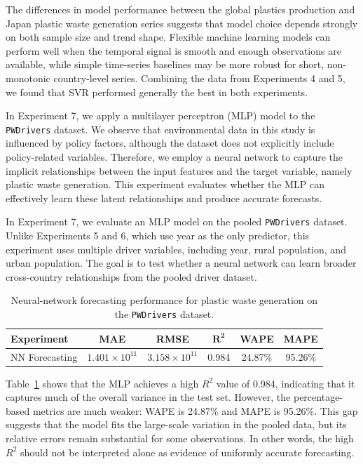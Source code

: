 The differences in model performance between the global plastics production and Japan plastic waste generation series suggests that model choice depends strongly on both sample size and trend shape. Flexible machine learning models can perform well when the temporal signal is smooth and enough observations are available, while simple time-series baselines may be more robust for short, non-monotonic country-level series. Combining the data from Experiments 4 and 5, we found that SVR performed generally the best in both experiments.


In Experiment 7, we apply a multilayer perceptron (MLP) model to the \texttt{PWDrivers} dataset. We observe that environmental data in this study is influenced by policy factors, although the dataset does not explicitly include policy-related variables. Therefore, we employ a neural network to capture the implicit relationships between the input features and the target variable, namely plastic waste generation. This experiment evaluates whether the MLP can effectively learn these latent relationships and produce accurate forecasts.

In Experiment 7, we evaluate an MLP model on the pooled \texttt{PWDrivers} dataset. Unlike Experiments 5 and 6, which use year as the only predictor, this experiment uses multiple driver variables, including year, rural population, and urban population. The goal is to test whether a neural network can learn broader cross-country relationships from the pooled driver dataset.

\begin{table}[!ht]
	\centering
	\caption{\centering Neural-network forecasting performance for plastic waste generation on the \texttt{PWDrivers} dataset.}
	\begin{tabular}{@{}lccccc@{}}
		\toprule
		\textbf{Experiment} & \textbf{MAE}           & \textbf{RMSE}          & $\mathbf{R^2}$ & \textbf{WAPE} & \textbf{MAPE} \\
		\midrule
		NN Forecasting      & \(1.401 \times 10^11\) & \(3.158 \times 10^11\) & 0.984          & 24.87\%       & 95.26\%       \\
		\hline
	\end{tabular}
	\label{tab:nn_forecasting_metrics}
\end{table}

Table~\ref{tab:nn_forecasting_metrics} shows that the MLP achieves a high \(R^2\) value of 0.984, indicating that it captures much of the overall variance in the test set. However, the percentage-based metrics are much weaker: WAPE is 24.87\% and MAPE is 95.26\%. This gap suggests that the model fits the large-scale variation in the pooled data, but its relative errors remain substantial for some observations. In other words, the high \(R^2\) should not be interpreted alone as evidence of uniformly accurate forecasting.

